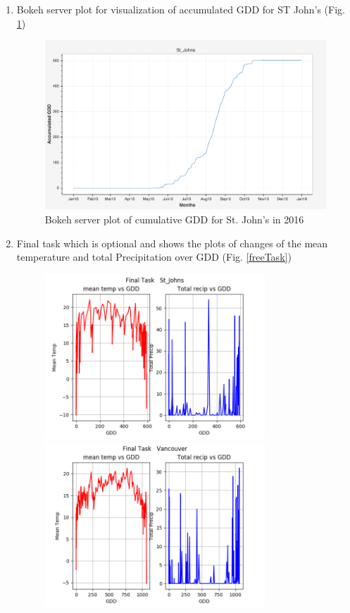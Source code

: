 \documentclass{article}
\begin{document}
\begin{enumerate}
\item Bokeh server plot for visualization of accumulated GDD for ST John's (Fig. \ref{bokeh-server-plot_sj})

\begin{center}
\begin{figure}[H]
\includegraphics[width=4.25in]{secTask-5.png}
\caption{Bokeh server plot of cumulative GDD for St. John's in 2016}
\label{bokeh-server-plot_sj}
\end{figure}
\end{center}

\item Final task which is optional and shows the plots of changes of the mean temperature and total Precipitation over GDD (Fig. \ref{freeTask})
\begin{center}
\begin{figure}[H] 
\includegraphics[width=3.25in]{finalTaskSt_Johns.png}\\

\includegraphics[width=3.25in]{finalTaskVancouver.png}\\


\end{figure}
\end{center}
\end{enumerate}
\end{document}

